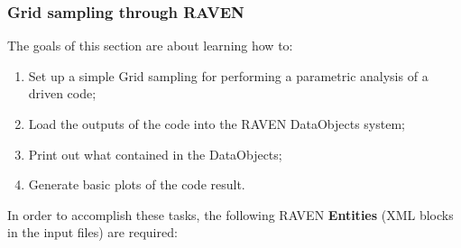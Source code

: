 \subsubsection{Grid sampling through RAVEN}
\label{subsub:Gridexample}
The goals of this section are about learning how to:
 \begin{enumerate}
   \item Set up a simple Grid sampling for performing a parametric analysis of a driven code;
   \item Load the outputs of the code into the RAVEN DataObjects system;
   \item Print out what contained in the DataObjects;
   \item Generate basic plots of the code result.
\end{enumerate}  
In order to accomplish these tasks, the following RAVEN \textbf{Entities} (XML blocks in the input files) are required:
